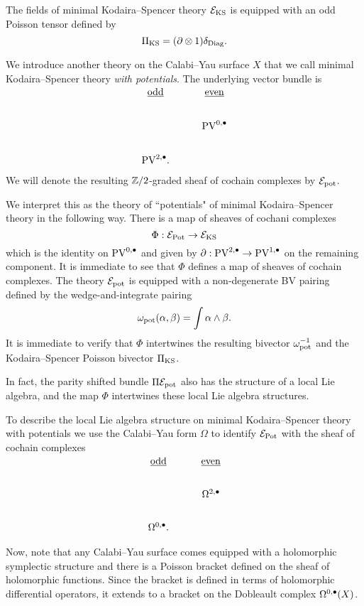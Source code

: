 \documentclass[11pt]{amsart}
\def\PV{{\rm PV}}
\begin{document}
The fields of minimal Kodaira--Spencer theory $\mathcal E_{\rm KS}$ is equipped with an odd Poisson tensor defined by
\[
\Pi_{\rm KS} = (\partial \otimes 1) \delta_{\rm Diag} .
\]

We introduce another theory on the Calabi--Yau surface $X$ that we call minimal Kodaira--Spencer theory {\em with potentials}.
The underlying vector bundle is
\[
\begin{tikzcd}
\ul{\rm odd} & \ul{\rm even} \\
 & \PV^{0,\bu} \\
 \PV^{2,\bu}  .
\end{tikzcd}
\]
We will denote the resulting $\mathbb Z /2$-graded sheaf of cochain complexes by $\mathcal E_{\rm pot}$.

We interpret this as the theory of  ``potentials"  of minimal Kodaira--Spencer theory in the following way.
There is a map of sheaves of cochani complexes
\[
\Phi : \mathcal E_{\rm Pot} \to \mathcal E_{\rm KS}
\]
which is the identity on $\PV^{0,\bu}$ and given by $\partial : \PV^{2,\bu} \to \PV^{1,\bu}$ on the remaining component.
It is immediate to see that $\Phi$ defines a map of sheaves of cochain complexes.
The theory $\mathcal E_{\rm pot}$ is equipped with a non-degenerate BV pairing defined by the wedge-and-integrate pairing
\[
\omega_{\rm pot} (\alpha, \beta) = \int \alpha \wedge \beta  .
\]
It is immediate to verify that $\Phi$ intertwines the resulting bivector $\omega_{\rm pot}^{-1}$ and the Kodaira--Spencer Poisson bivector $\Pi_{\rm KS}$.

In fact, the parity shifted bundle $\Pi \mathcal E_{\rm pot}$ also has the structure of a local Lie algebra, and the map $\Phi$ intertwines these local Lie algebra structures.

To describe the local Lie algebra structure on minimal Kodaira--Spencer theory with potentials we use the Calabi--Yau form $\Omega$ to identify $\mathcal E_{\rm Pot}$ with the sheaf of cochain complexes
\[
\begin{tikzcd}
\ul{\rm odd} & \ul{\rm even} \\
 & \Omega^{2,\bu} \\
 \Omega^{0,\bu}  .
\end{tikzcd}
\]

Now, note that any Calabi--Yau surface comes equipped with a holomorphic symplectic structure and there is a Poisson bracket defined on the sheaf of holomorphic functions.
Since the bracket is defined in terms of holomorphic differential operators, it extends to a bracket on the Dobleault complex $\Omega^{0,\bullet}(X)$.
\end{document}
